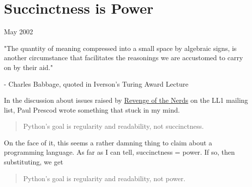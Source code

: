 \chapter{Succinctness is Power}


            
              
                

May 2002


                  
                    
                      
                        
                          
                            
                              
                                "The quantity of meaning compressed into a small
                                space by algebraic signs, is another
                                circumstance that facilitates the reasonings we
                                are accustomed to carry on by their aid."

-
                                Charles Babbage, quoted in Iverson's Turing
                                Award Lecture
                              
                            
                          
                        
                      
                    
                  
                  


                  In the discussion about issues raised by
                  \href{http://www.paulgraham.com/icad.html}{Revenge of the Nerds} on the LL1
                  mailing list, Paul Prescod wrote something that stuck in my
                  mind.
                  \begin{quote}

                    Python's goal is regularity and readability, not
                    succinctness.
                  
\end{quote}

                  On the face of it, this seems a rather damning thing to claim
                  about a programming language. As far as I can tell,
                  succinctness = power. If so, then substituting, we get
                  \begin{quote}

                    Python's goal is regularity and readability, not power.
                  
\end{quote}

